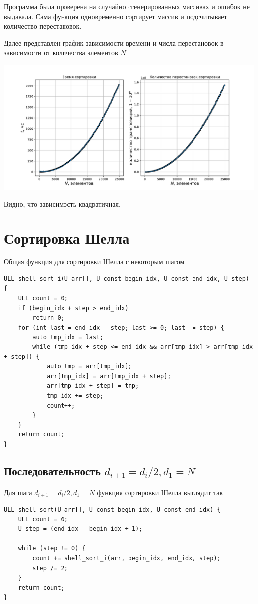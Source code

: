 \documentclass[a4paper,12pt]{article}
\begin{document}
Программа была проверена на случайно сгенерированных массивах и ошибок не выдавала.
Сама функция одновременно сортирует массив и подсчитывает количество перестановок.

Далее представлен график зависимости времени и числа перестановок в зависимости от количества элементов $N$

\begin{center}
\includegraphics[scale=0.6]{Figure_1.pdf}
\end{center}

Видно, что зависимость квадратичная.

\section*{Сортировка Шелла}
Общая функция для сортировки Шелла с некоторым шагом
\begin{lstlisting}
ULL shell_sort_i(U arr[], U const begin_idx, U const end_idx, U step) {
    ULL count = 0;
    if (begin_idx + step > end_idx)
        return 0;
    for (int last = end_idx - step; last >= 0; last -= step) {
        auto tmp_idx = last;
        while (tmp_idx + step <= end_idx && arr[tmp_idx] > arr[tmp_idx + step]) {
            auto tmp = arr[tmp_idx];
            arr[tmp_idx] = arr[tmp_idx + step];
            arr[tmp_idx + step] = tmp;
            tmp_idx += step;
            count++;
        }
    }
    return count;
}
\end{lstlisting}

\subsection*{Последовательность $d_{i+1} = d_i / 2, d_1 = N$}
Для шага $d_{i+1} = d_i / 2, d_1 = N$ функция сортировки Шелла выглядит так
\begin{lstlisting}
ULL shell_sort(U arr[], U const begin_idx, U const end_idx) {
    ULL count = 0;
    U step = (end_idx - begin_idx + 1);

    while (step != 0) {
        count += shell_sort_i(arr, begin_idx, end_idx, step);
        step /= 2;
    }
    return count;
}
\end{lstlisting}
\end{document}
